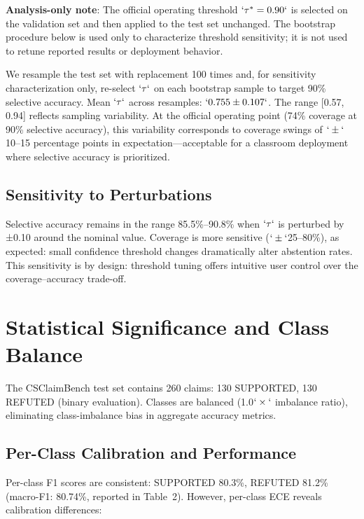\textbf{Analysis-only note}: The official operating threshold \(`\tau^*=0.90`\) is selected on the validation set and then applied to the test set unchanged. The bootstrap procedure below is used only to characterize threshold sensitivity; it is not used to retune reported results or deployment behavior.

We resample the test set with replacement 100 times and, for sensitivity characterization only, re-select \(`\tau`\) on each bootstrap sample to target 90\% selective accuracy. Mean \(`\tau`\) across resamples: \(`0.755 \pm 0.107`\). The range {[}0.57, 0.94{]} reflects sampling variability. At the official operating point (74\% coverage at 90\% selective accuracy), this variability corresponds to coverage swings of \(`\pm`\)10--15 percentage points in expectation---acceptable for a classroom deployment where selective accuracy is prioritized.

\subsection{Sensitivity to Perturbations}\label{sensitivity-to-perturbations}

Selective accuracy remains in the range 85.5\%--90.8\% when \(`\tau`\) is perturbed by ±0.10 around the nominal value. Coverage is more sensitive (\(`\pm`\)25--80\%), as expected: small confidence threshold changes dramatically alter abstention rates. This sensitivity is by design: threshold tuning offers intuitive user control over the coverage--accuracy trade-off.

\section{Statistical Significance and Class Balance}\label{statistical-significance-and-class-balance}

The CSClaimBench test set contains 260 claims: 130 SUPPORTED, 130 REFUTED (binary evaluation). Classes are balanced (1.0\(`\times`\) imbalance ratio), eliminating class-imbalance bias in aggregate accuracy metrics.

\subsection{Per-Class Calibration and Performance}\label{per-class-calibration-and-performance}

Per-class F1 scores are consistent: SUPPORTED 80.3\%, REFUTED 81.2\% (macro-F1: 80.74\%, reported in Table~2). However, per-class ECE reveals calibration differences:

